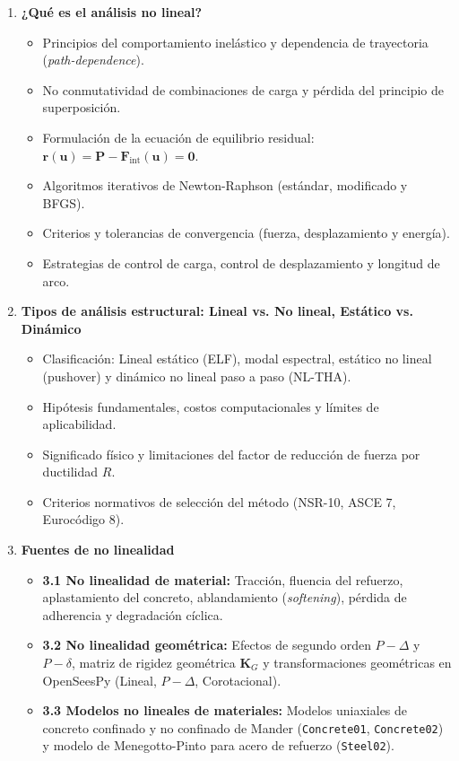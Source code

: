 \documentclass[11pt,letterpaper]{article}
\begin{document}
\begin{enumerate}[leftmargin=18pt, topsep=2pt, itemsep=3.5pt, parsep=0pt, label=\textbf{\arabic*.}]
    \item \textbf{¿Qué es el análisis no lineal?}
    \begin{itemize}[leftmargin=12pt, topsep=1pt, itemsep=1pt]
        \item Principios del comportamiento inelástico y dependencia de trayectoria (\textit{path-dependence}).
        \item No conmutatividad de combinaciones de carga y pérdida del principio de superposición.
        \item Formulación de la ecuación de equilibrio residual: $\mathbf{r}(\mathbf{u}) = \mathbf{P} - \mathbf{F}_{\text{int}}(\mathbf{u}) = \mathbf{0}$.
        \item Algoritmos iterativos de Newton-Raphson (estándar, modificado y BFGS).
        \item Criterios y tolerancias de convergencia (fuerza, desplazamiento y energía).
        \item Estrategias de control de carga, control de desplazamiento y longitud de arco.
    \end{itemize}

    \item \textbf{Tipos de análisis estructural: Lineal vs. No lineal, Estático vs. Dinámico}
    \begin{itemize}[leftmargin=12pt, topsep=1pt, itemsep=1pt]
        \item Clasificación: Lineal estático (ELF), modal espectral, estático no lineal (pushover) y dinámico no lineal paso a paso (NL-THA).
        \item Hipótesis fundamentales, costos computacionales y límites de aplicabilidad.
        \item Significado físico y limitaciones del factor de reducción de fuerza por ductilidad $R$.
        \item Criterios normativos de selección del método (NSR-10, ASCE 7, Eurocódigo 8).
    \end{itemize}

    \item \textbf{Fuentes de no linealidad}
    \begin{itemize}[leftmargin=12pt, topsep=1pt, itemsep=1pt]
        \item \textbf{3.1 No linealidad de material:} Tracción, fluencia del refuerzo, aplastamiento del concreto, ablandamiento (\textit{softening}), pérdida de adherencia y degradación cíclica.
        \item \textbf{3.2 No linealidad geométrica:} Efectos de segundo orden $P-\Delta$ y $P-\delta$, matriz de rigidez geométrica $\mathbf{K}_G$ y transformaciones geométricas en OpenSeesPy (Lineal, $P-\Delta$, Corotacional).
        \item \textbf{3.3 Modelos no lineales de materiales:} Modelos uniaxiales de concreto confinado y no confinado de Mander (\texttt{Concrete01}, \texttt{Concrete02}) y modelo de Menegotto-Pinto para acero de refuerzo (\texttt{Steel02}).
    \end{itemize}


\end{enumerate}
\end{document}
